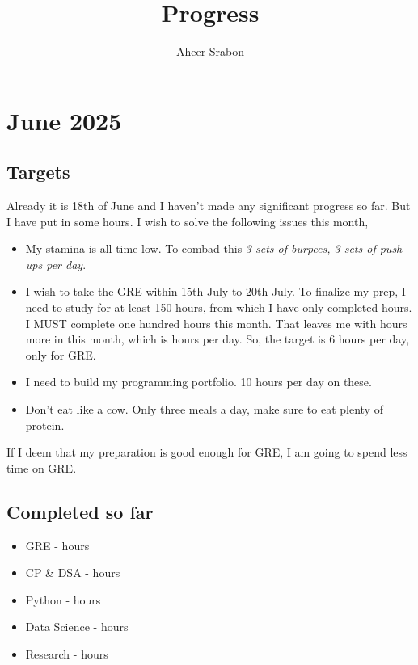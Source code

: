 \documentclass[11pt]{article}
\title{Progress}
\author{Aheer Srabon}
\date{}
\begin{document}
\maketitle

\section*{June 2025}



\subsection*{Targets}
\noindent Already it is 18th of June and I haven't made any significant progress so far. But
I have put in some hours. I wish to solve the following issues this month,

\begin{itemize}
\itemsep0em
  \item My stamina is all time low. To combad this \emph{3 sets of burpees, 3 sets of push ups per day}.
  \item I wish to take the GRE within 15th July to 20th July. To finalize my prep, I need to study for
        at least 150 hours, from which I have only completed \juneGRE hours. I MUST complete one hundred
        hours this month. That leaves me with  hours more in this month, which is
         hours per day. So, the target is 6 hours per day, only for GRE.
  \item I need to build my programming portfolio. 10 hours per day on these.
  \item Don't eat like a cow. Only three meals a day, make sure to eat plenty of protein.
\end{itemize}

\noindent If I deem that my preparation is good enough for GRE, I am going to spend less time on GRE.

\subsection*{Completed so far}
\begin{itemize}
\itemsep0em
  \item GRE           - \juneGRE hours
  \item CP \& DSA     - \juneDSACP hours
  \item Python        - \junePYTHON hours
  \item Data Science  - \juneDS hours
  \item Research      - \juneRESEARCH hours
\end{itemize}
\end{document}
